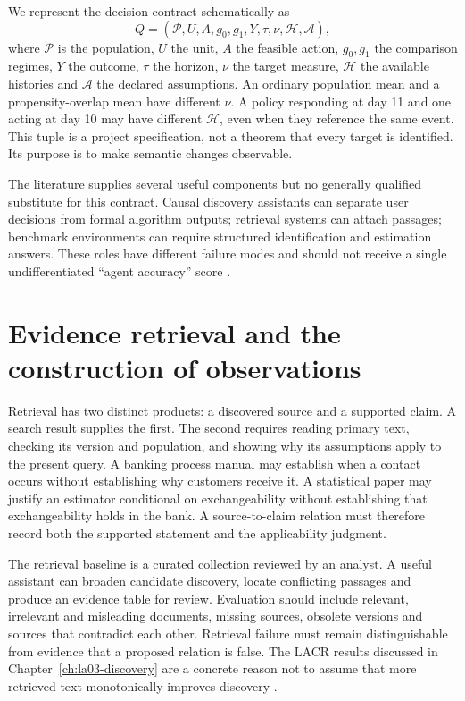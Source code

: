 We represent the decision contract schematically as
\[
 Q=(\mathcal P,U,A,g_0,g_1,Y,\tau,\nu,\mathcal H,\mathcal A),
\]
where $\mathcal P$ is the population, $U$ the unit, $A$ the feasible action,
$g_0,g_1$ the comparison regimes, $Y$ the outcome, $\tau$ the horizon, $\nu$ the
target measure, $\mathcal H$ the available histories and $\mathcal A$ the declared
assumptions. An ordinary population mean and a propensity-overlap mean have
different $\nu$. A policy responding at day 11 and one acting at day 10 may have
different $\mathcal H$, even when they reference the same event. This tuple is a
project specification, not a theorem that every target is identified. Its
purpose is to make semantic changes observable.

The literature supplies several useful components but no generally qualified
substitute for this contract. Causal discovery assistants can separate user
decisions from formal algorithm outputs; retrieval systems can attach passages;
benchmark environments can require structured identification and estimation
answers. These roles have different failure modes and should not receive a
single undifferentiated ``agent accuracy'' score
\cite{v12_la_2606_23608,v12_la_2402_15301,v12_la_package_causalds}.

\section{Evidence retrieval and the construction of observations}

Retrieval has two distinct products: a discovered source and a supported claim.
A search result supplies the first. The second requires reading primary text,
checking its version and population, and showing why its assumptions apply to
the present query. A banking process manual may establish when a contact occurs
without establishing why customers receive it. A statistical paper may justify
an estimator conditional on exchangeability without establishing that
exchangeability holds in the bank. A source-to-claim relation must therefore
record both the supported statement and the applicability judgment.

The retrieval baseline is a curated collection reviewed by an analyst. A useful
assistant can broaden candidate discovery, locate conflicting passages and
produce an evidence table for review. Evaluation should include relevant,
irrelevant and misleading documents, missing sources, obsolete versions and
sources that contradict each other. Retrieval failure must remain distinguishable
from evidence that a proposed relation is false. The LACR results discussed in
Chapter~\ref{ch:la03-discovery} are a concrete reason not to assume that more retrieved
text monotonically improves discovery \cite{v12_la_2402_15301}.

